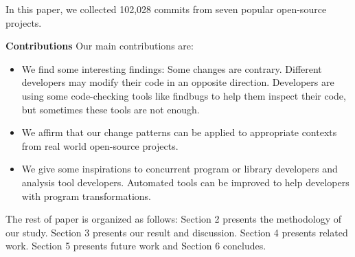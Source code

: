 In this paper, we collected 102,028 commits from seven popular open-source projects. 

\textbf{Contributions} Our main contributions are:

\begin{itemize}
	\item We find some interesting findings: Some changes are contrary. Different developers may modify their code in an opposite direction. Developers are using some code-checking tools like findbugs to help them inspect their code, but sometimes these tools are not enough.
	\item We affirm that our change patterns can be applied to appropriate  contexts from real world open-source projects.
	\item We give some inspirations to concurrent program or library developers and analysis tool developers. Automated tools can be improved to help developers with program transformations.
\end{itemize}

The rest of paper is organized as follows: Section 2 presents the methodology of our study. Section 3 presents our result and discussion. Section 4 presents related work. Section 5 presents future work and Section 6 concludes.
